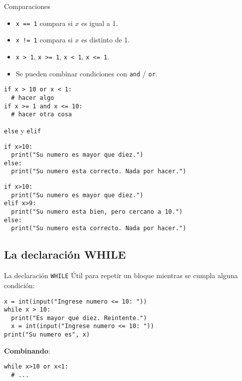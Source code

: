 \documentclass[10pt]{beamer}
\begin{document}
\begin{frame}[fragile]{Comparaciones}
\footnotesize
\begin{itemize}
    \item \texttt{x == 1}  compara si \(x\) es igual a 1.
    \item \texttt{x != 1}  compara si \(x\) es distinto de 1.
    \item \texttt{x > 1}, \texttt{x >= 1}, \texttt{x < 1}, \texttt{x <= 1}.
    \item Se pueden combinar condiciones con \texttt{and} / \texttt{or}.
\end{itemize}

\begin{verbatim}
if x > 10 or x < 1:
  # hacer algo
if x >= 1 and x <= 10:
  # hacer otra cosa
\end{verbatim}
\end{frame}

\begin{frame}[fragile]{\texttt{else} y \texttt{elif}}
\begin{verbatim}
if x>10:
  print("Su numero es mayor que diez.")
else:
  print("Su numero esta correcto. Nada por hacer.")
\end{verbatim}

\begin{verbatim}
if x>10:
  print("Su numero es mayor que diez.")
elif x>9:
  print("Su numero esta bien, pero cercano a 10.")
else:
  print("Su numero esta correcto. Nada por hacer.")
\end{verbatim}
\end{frame}

\subsection{La declaración WHILE}
\begin{frame}[fragile]{La declaración \texttt{WHILE}}
Útil para repetir un bloque mientras se cumpla alguna condición:
\begin{verbatim}
x = int(input("Ingrese numero <= 10: "))
while x > 10:
  print("Es mayor que diez. Reintente.")
  x = int(input("Ingrese numero <= 10: "))
print("Su numero es", x)
\end{verbatim}

\textbf{Combinando}:  
\begin{verbatim}
while x>10 or x<1:
  # ...
\end{verbatim}
\end{frame}
\end{document}
